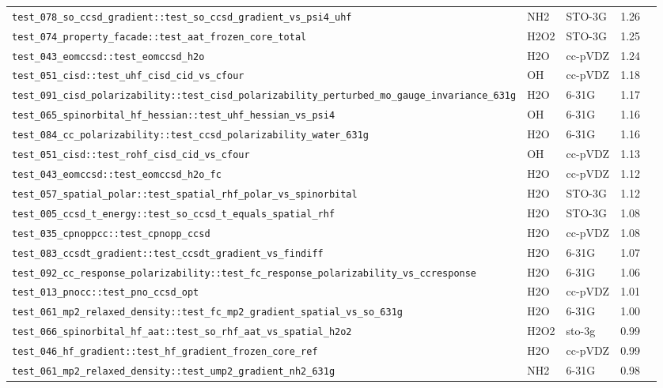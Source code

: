 \documentclass[10pt]{article}
\begin{document}
\begin{longtable}{l l l r c}
\texttt{test\_078\_so\_ccsd\_gradient::test\_so\_ccsd\_gradient\_vs\_psi4\_uhf} & NH2 & STO-3G & 1.26 &  \\
\texttt{test\_074\_property\_facade::test\_aat\_frozen\_core\_total} & H2O2 & STO-3G & 1.25 &  \\
\texttt{test\_043\_eomccsd::test\_eomccsd\_h2o} & H2O & cc-pVDZ & 1.24 &  \\
\texttt{test\_051\_cisd::test\_uhf\_cisd\_cid\_vs\_cfour} & OH & cc-pVDZ & 1.18 &  \\
\texttt{test\_091\_cisd\_polarizability::test\_cisd\_polarizability\_perturbed\_mo\_gauge\_invariance\_631g} & H2O & 6-31G & 1.17 &  \\
\texttt{test\_065\_spinorbital\_hf\_hessian::test\_uhf\_hessian\_vs\_psi4} & OH & 6-31G & 1.16 &  \\
\texttt{test\_084\_cc\_polarizability::test\_ccsd\_polarizability\_water\_631g} & H2O & 6-31G & 1.16 &  \\
\texttt{test\_051\_cisd::test\_rohf\_cisd\_cid\_vs\_cfour} & OH & cc-pVDZ & 1.13 &  \\
\texttt{test\_043\_eomccsd::test\_eomccsd\_h2o\_fc} & H2O & cc-pVDZ & 1.12 &  \\
\texttt{test\_057\_spatial\_polar::test\_spatial\_rhf\_polar\_vs\_spinorbital} & H2O & STO-3G & 1.12 &  \\
\texttt{test\_005\_ccsd\_t\_energy::test\_so\_ccsd\_t\_equals\_spatial\_rhf} & H2O & STO-3G & 1.08 &  \\
\texttt{test\_035\_cpnoppcc::test\_cpnopp\_ccsd} & H2O & cc-pVDZ & 1.08 &  \\
\texttt{test\_083\_ccsdt\_gradient::test\_ccsdt\_gradient\_vs\_findiff} & H2O & 6-31G & 1.07 &  \\
\texttt{test\_092\_cc\_response\_polarizability::test\_fc\_response\_polarizability\_vs\_ccresponse} & H2O & 6-31G & 1.06 &  \\
\texttt{test\_013\_pnocc::test\_pno\_ccsd\_opt} & H2O & cc-pVDZ & 1.01 &  \\
\texttt{test\_061\_mp2\_relaxed\_density::test\_fc\_mp2\_gradient\_spatial\_vs\_so\_631g} & H2O & 6-31G & 1.00 &  \\
\texttt{test\_066\_spinorbital\_hf\_aat::test\_so\_rhf\_aat\_vs\_spatial\_h2o2} & H2O2 & sto-3g & 0.99 &  \\
\texttt{test\_046\_hf\_gradient::test\_hf\_gradient\_frozen\_core\_ref} & H2O & cc-pVDZ & 0.99 &  \\
\texttt{test\_061\_mp2\_relaxed\_density::test\_ump2\_gradient\_nh2\_631g} & NH2 & 6-31G & 0.98 &  \\

\end{longtable}
\end{document}
